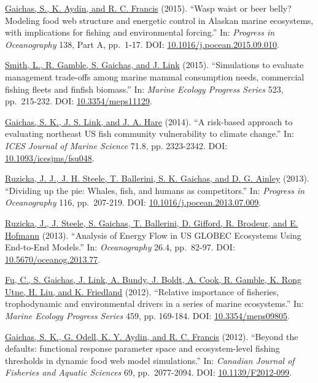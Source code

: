 \documentclass[11pt, a4paper]{awesome-cv}
\begin{document}
\protect\hyperlink{cite-gaichas_wasp_2015}{Gaichas, S., K. Aydin, and R.
C. Francis} (2015). ``Wasp waist or beer belly? Modeling food web
structure and energetic control in Alaskan marine ecosystems, with
implications for fishing and environmental forcing.'' In: \emph{Progress
in Oceanography} 138, Part A, pp.~1-17. DOI:
\href{https://doi.org/10.1016\%2Fj.pocean.2015.09.010}{10.1016/j.pocean.2015.09.010}.

\protect\hyperlink{cite-smith_simulations_2015}{Smith, L., R. Gamble, S.
Gaichas, and J. Link} (2015). ``Simulations to evaluate management
trade-offs among marine mammal consumption needs, commercial fishing
fleets and finfish biomass.'' In: \emph{Marine Ecology Progress Series}
523, pp.~215-232. DOI:
\href{https://doi.org/10.3354\%2Fmeps11129}{10.3354/meps11129}.

\protect\hyperlink{cite-gaichas_risk-based_2014}{Gaichas, S. K., J. S.
Link, and J. A. Hare} (2014). ``A risk-based approach to evaluating
northeast US fish community vulnerability to climate change.'' In:
\emph{ICES Journal of Marine Science} 71.8, pp. 2323-2342. DOI:
\href{https://doi.org/10.1093\%2Ficesjms\%2Ffsu048}{10.1093/icesjms/fsu048}.

\protect\hyperlink{cite-ruzicka_dividing_2013}{Ruzicka, J. J., J. H.
Steele, T. Ballerini, S. K. Gaichas, and D. G. Ainley} (2013).
``Dividing up the pie: Whales, fish, and humans as competitors.'' In:
\emph{Progress in Oceanography} 116, pp.~207-219. DOI:
\href{https://doi.org/10.1016\%2Fj.pocean.2013.07.009}{10.1016/j.pocean.2013.07.009}.

\protect\hyperlink{cite-ruzicka_analysis_2013}{Ruzicka, J., J. Steele,
S. Gaichas, T. Ballerini, D. Gifford, R. Brodeur, and E. Hofmann}
(2013). ``Analysis of Energy Flow in US GLOBEC Ecosystems Using
End-to-End Models.'' In: \emph{Oceanography} 26.4, pp.~82-97. DOI:
\href{https://doi.org/10.5670\%2Foceanog.2013.77}{10.5670/oceanog.2013.77}.

\protect\hyperlink{cite-fu_relative_2012}{Fu, C., S. Gaichas, J. Link,
A. Bundy, J. Boldt, A. Cook, R. Gamble, K. Rong Utne, H. Liu, and K.
Friedland} (2012). ``Relative importance of fisheries, trophodynamic and
environmental drivers in a series of marine ecosystems.'' In:
\emph{Marine Ecology Progress Series} 459, pp. 169-184. DOI:
\href{https://doi.org/10.3354\%2Fmeps09805}{10.3354/meps09805}.

\protect\hyperlink{cite-gaichas_beyond_2012}{Gaichas, S. K., G. Odell,
K. Y. Aydin, and R. C. Francis} (2012). ``Beyond the defaults:
functional response parameter space and ecosystem-level fishing
thresholds in dynamic food web model simulations.'' In: \emph{Canadian
Journal of Fisheries and Aquatic Sciences} 69, pp.~2077-2094. DOI:
\href{https://doi.org/10.1139\%2FF2012-099}{10.1139/F2012-099}.
\end{document}
